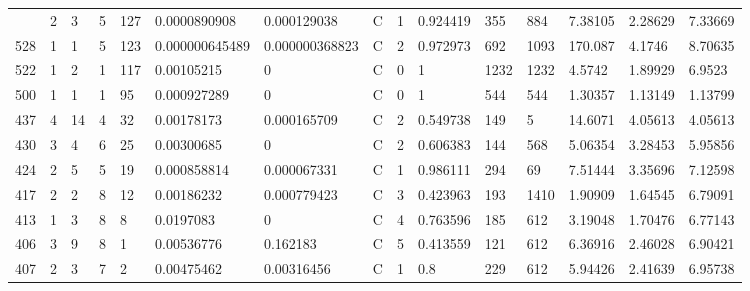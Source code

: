 \begin{latin}
\begin{longtable}{lllllllllllllll}
\begin{comment}
	532 & 2  & 3   & 5  & 127 & 0.0000890908   & 0.000129038    & C & 1  & 0.924419 & 355  & 884  & 7.38105 & 2.28629 & 7.33669 \\
	528 & 1  & 1   & 5  & 123 & 0.000000645489 & 0.000000368823 & C & 2  & 0.972973 & 692  & 1093 & 170.087 & 4.1746  & 8.70635 \\
	522 & 1  & 2   & 1  & 117 & 0.00105215     & 0              & C & 0  & 1        & 1232 & 1232 & 4.5742  & 1.89929 & 6.9523  \\
	500 & 1  & 1   & 1  & 95  & 0.000927289    & 0              & C & 0  & 1        & 544  & 544  & 1.30357 & 1.13149 & 1.13799 \\
	437 & 4  & 14  & 4  & 32  & 0.00178173     & 0.000165709    & C & 2  & 0.549738 & 149  & 5    & 14.6071 & 4.05613 & 4.05613 \\
	430 & 3  & 4   & 6  & 25  & 0.00300685     & 0              & C & 2  & 0.606383 & 144  & 568  & 5.06354 & 3.28453 & 5.95856 \\
	424 & 2  & 5   & 5  & 19  & 0.000858814    & 0.000067331    & C & 1  & 0.986111 & 294  & 69   & 7.51444 & 3.35696 & 7.12598 \\
	417 & 2  & 2   & 8  & 12  & 0.00186232     & 0.000779423    & C & 3  & 0.423963 & 193  & 1410 & 1.90909 & 1.64545 & 6.79091 \\
	413 & 1  & 3   & 8  & 8   & 0.0197083      & 0              & C & 4  & 0.763596 & 185  & 612  & 3.19048 & 1.70476 & 6.77143 \\
	406 & 3  & 9   & 8  & 1   & 0.00536776     & 0.162183       & C & 5  & 0.413559 & 121  & 612  & 6.36916 & 2.46028 & 6.90421 \\
	407 & 2  & 3   & 7  & 2   & 0.00475462     & 0.00316456     & C & 1  & 0.8      & 229  & 612  & 5.94426 & 2.41639 & 6.95738
	\end{comment}
\end{longtable}
\end{latin}


